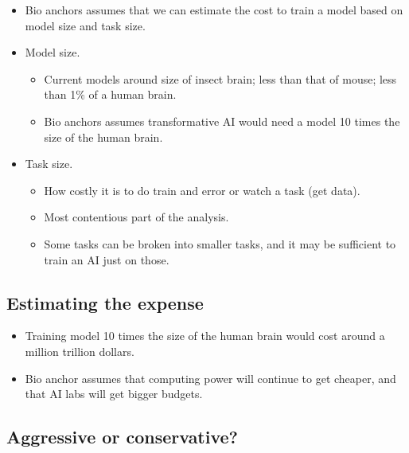 \begin{itemize}
    \item Bio anchors assumes that we can estimate the cost to train a model based on model size and task size.
    \item Model size.
    \begin{itemize}
        \item Current models around size of insect brain; less than that of mouse; less than 1\% of a human brain.
        \item Bio anchors assumes transformative AI would need a model 10 times the size of the human brain.
    \end{itemize}
    \item Task size.
    \begin{itemize}
        \item How costly it is to do train and error or watch a task (get data).
        \item Most contentious part of the analysis.
        \item Some tasks can be broken into smaller tasks, and it may be sufficient to train an AI just on those.
    \end{itemize}
\end{itemize}


\subsection{Estimating the expense}

\begin{itemize}
    \item Training model 10 times the size of the human brain would cost around a million trillion dollars.
    \item Bio anchor assumes that computing power will continue to get cheaper, and that AI labs will get bigger budgets.
\end{itemize}


\subsection{Aggressive or conservative?}


